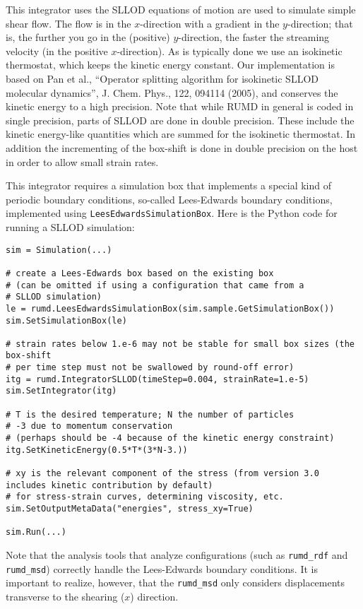 \documentclass[a4paper]{article}
\begin{document}
This integrator uses the SLLOD equations of motion are used 
to simulate simple shear flow. The flow is in the $x$-direction with a gradient
in the $y$-direction; that is, the further you go in the (positive) 
$y$-direction, the faster the streaming velocity (in the positive 
$x$-direction). As is typically done we use an isokinetic thermostat, which 
keeps the kinetic energy constant. Our implementation is based on Pan et al., 
``Operator splitting algorithm for isokinetic SLLOD molecular dynamics'', J. 
Chem. Phys., 122, 094114 (2005), and conserves the kinetic energy to a high 
precision. Note that while RUMD in general is coded in single precision, parts of SLLOD
are done in double precision. These include the kinetic energy-like quantities
which are summed for the isokinetic thermostat. In addition the incrementing
of the box-shift is done in double precision on the host in order to allow
small strain rates.

This integrator requires a simulation box that implements a special kind of
periodic boundary conditions, so-called Lees-Edwards boundary conditions, 
implemented using \verb|LeesEdwardsSimulationBox|. Here is the 
Python code for running a SLLOD simulation:

\begin{verbatim}
sim = Simulation(...)

# create a Lees-Edwards box based on the existing box
# (can be omitted if using a configuration that came from a 
# SLLOD simulation)
le = rumd.LeesEdwardsSimulationBox(sim.sample.GetSimulationBox())
sim.SetSimulationBox(le)

# strain rates below 1.e-6 may not be stable for small box sizes (the box-shift
# per time step must not be swallowed by round-off error)
itg = rumd.IntegratorSLLOD(timeStep=0.004, strainRate=1.e-5)
sim.SetIntegrator(itg)

# T is the desired temperature; N the number of particles
# -3 due to momentum conservation
# (perhaps should be -4 because of the kinetic energy constraint)
itg.SetKineticEnergy(0.5*T*(3*N-3.))

# xy is the relevant component of the stress (from version 3.0 includes kinetic contribution by default)
# for stress-strain curves, determining viscosity, etc.
sim.SetOutputMetaData("energies", stress_xy=True)

sim.Run(...)
\end{verbatim}
Note that the analysis tools that analyze configurations (such as 
\verb|rumd_rdf| and \verb|rumd_msd|) correctly handle the Lees-Edwards boundary
conditions. It is important to realize, however, that the \verb|rumd_msd|
only considers displacements transverse to the shearing ($x$) direction.
\end{document}
